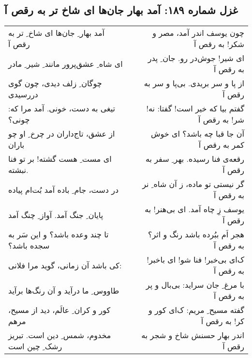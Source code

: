 \begin{center}
\section*{غزل شماره ۱۸۹: آمد بهار جان‌ها ای شاخ تر به رقص آ}
\label{sec:0189}
\begin{longtable}{l p{0.5cm} r}
آمد بهار ِ جان‌ها ای شاخ ِ تر به رقص آ
&&
چون یوسف اندر آمد، مصر و شکر! به رقص آ
\\
ای شاه ِ عشق‌پرور مانند ِ شیر ِ مادر
&&
ای شیر! جوش‌در رو. جان ِ پدر به رقص آ
\\
چوگان ِ زلف دیدی، چون گوی دررسیدی
&&
از پا و سر بریدی. بی‌پا و سر به رقص آ
\\
تیغی به دست، خونی. آمد مرا که: چونی؟
&&
گفتم بیا که خیر است! گفتا: نه! شر! به رقص آ
\\
از عشق، تاج‌داران در چرخ ِ او چو باران
&&
آن جا قبا چه باشد؟ ای خوش کمر به رقص آ
\\
ای مست ِ هست گشته! بر تو فنا نبشته.
&&
رقعه‌ی فنا رسیده. بهر ِ سفر به رقص آ
\\
در دست، جام ِ باده آمد بُت‌ام پیاده
&&
گر نیستی تو ماده، ز آن شاه ِ نر به رقص آ
\\
پایان ِ جنگ آمد. آواز ِ چنگ آمد
&&
یوسف زِ چاه آمد. ای بی‌هنر! به رقص آ
\\
تا چند وعده باشد؟ و این سَر به سجده باشد؟
&&
هجر اَم ببُرده باشد رنگ و اثر؟ به رقص آ
\\
کی باشد آن زمانی، گوید مرا فلانی:
&&
ک‌ای بی‌خبر! فنا شو! ای باخبر! به رقص آ
\\
طاووس ِ ما درآید و آن رنگ‌ها برآید
&&
با مرغ ِ جان سراید: بی‌بال و پر به رقص آ
\\
کور و کران ِ عالَم، دید از مسیح، مرهم
&&
گفته مسیح ِ مریم: ک‌ای کور و کر! به رقص آ
\\
مخدوم، شمس ِ دین است. تبریز رشک ِ چین است
&&
اندر بهار حسنش شاخ و شجر به رقص آ
\\
\end{longtable}
\end{center}
